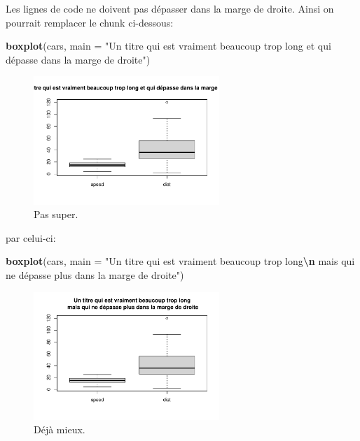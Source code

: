 \documentclass[mstat,12pt]{unswthesis}
\newenvironment{Shaded}{\begin{snugshade}}{\end{snugshade}}
\newcommand{\AttributeTok}[1]{\textcolor[rgb]{0.13,0.29,0.53}{#1}}
\newcommand{\FunctionTok}[1]{\textcolor[rgb]{0.13,0.29,0.53}{\textbf{#1}}}
\newcommand{\NormalTok}[1]{#1}
\newcommand{\SpecialCharTok}[1]{\textcolor[rgb]{0.81,0.36,0.00}{\textbf{#1}}}
\newcommand{\StringTok}[1]{\textcolor[rgb]{0.31,0.60,0.02}{#1}}
\begin{document}
Les lignes de code ne doivent pas dépasser dans la marge de droite.
Ainsi on pourrait remplacer le chunk ci-dessous:

\begin{Shaded}
\begin{Highlighting}[]
\FunctionTok{boxplot}\NormalTok{(cars, }\AttributeTok{main =} \StringTok{"Un titre qui est vraiment beaucoup trop long et qui dépasse dans la marge de droite"}\NormalTok{)}
\end{Highlighting}
\end{Shaded}

\begin{figure}

{\centering \includegraphics[width=7cm]{scdon2-UPV-report-template_sansPython_files/figure-latex/unnamed-chunk-4-1} 

}

\caption{Pas super.}\label{fig:unnamed-chunk-4}
\end{figure}

par celui-ci:

\tiny

\begin{Shaded}
\begin{Highlighting}[]
\FunctionTok{boxplot}\NormalTok{(cars, }
        \AttributeTok{main =} \StringTok{"Un titre qui est vraiment beaucoup trop long}\SpecialCharTok{\textbackslash{}n}\StringTok{ mais qui ne dépasse plus dans la marge de droite"}\NormalTok{)}
\end{Highlighting}
\end{Shaded}

\begin{figure}

{\centering \includegraphics[width=7cm]{scdon2-UPV-report-template_sansPython_files/figure-latex/unnamed-chunk-5-1} 

}

\caption{Déjà mieux.}\label{fig:unnamed-chunk-5}
\end{figure}
\end{document}
